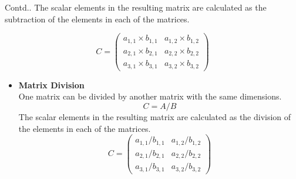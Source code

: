 \documentclass{beamer}
\begin{document}
\begin{frame}
\begin{block}{Contd..}
		The scalar elements in the resulting matrix are calculated as the subtraction of the elements in each of the matrices.
		
    	\begin{equation*}
    		C = \begin{pmatrix}
    				a_{1,1} \times b_{1,1}  & a_{1,2} \times b_{1,2} \\
    				a_{2,1} \times b_{2,1}  & a_{2,2} \times b_{2,2} \\
    				a_{3,1} \times b_{3,1}  & a_{3,2} \times b_{3,2} 
    			\end{pmatrix}
    	\end{equation*}
    \begin{itemize}
    	\item \textbf{Matrix Division}\\
	One matrix can be divided by another matrix with the same dimensions.
    	\begin{equation*}
    	C = A/B
    	\end{equation*}
    	The scalar elements in the resulting matrix are calculated as the division of the elements in each of the matrices.
    	\begin{equation*}
    		C = \begin{pmatrix}
    				a_{1,1}/b_{1,1}  & a_{1,2}/b_{1,2} \\
    				a_{2,1}/b_{2,1}  & a_{2,2}/b_{2,2} \\
    				a_{3,1}/b_{3,1}  & a_{3,2}/b_{3,2} 
    			\end{pmatrix}
    	\end{equation*}
    \end{itemize}
\end{block}
\end{frame}
\end{document}
